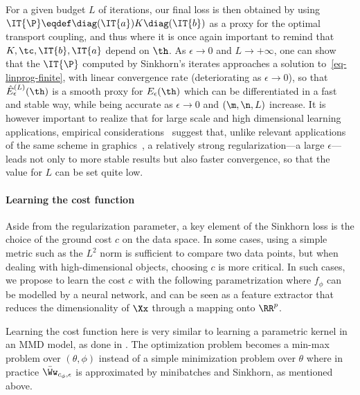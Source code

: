For a given budget $L$ of iterations, our final loss is then obtained by using $\IT{\P} \eqdef \diag(\IT{a})K\diag(\IT{b})$ as a proxy for the optimal transport coupling, and thus
where it is once again important to remind that $K,\tc,\IT{b},\IT{a}$ depend on $\th$. As $\epsilon \rightarrow 0$ and $L \rightarrow +\infty$, one can show that the $\IT{\P}$ computed by Sinkhorn's iterates approaches a solution to~\eqref{eq-linprog-finite}, with linear convergence rate (deteriorating as $\epsilon \rightarrow 0$), so that $\hat E_\epsilon ^{(L)}(\th)$ is a smooth proxy for $E_\epsilon(\th)$ which can be differentiated in a fast and stable way, while being accurate as $\epsilon\rightarrow 0$ and $(\m,\n,L)$ increase. 
% 
It is however important to realize that for large scale and high dimensional learning applications, empirical considerations~\cite{CuturiSinkhorn,kusner2015word,2015-Frogner} suggest that, unlike relevant applications of the same scheme in graphics~\cite{solomon2015convolutional}, a relatively strong regularization---a large $\epsilon$---leads not only to more stable results but also faster convergence, so that the value for $L$ can be set quite low.

\paragraph{Learning the cost function}

Aside from the regularization parameter, a key element of the Sinkhorn loss is the choice of the ground cost $c$ on the data space. In some cases, using a simple metric such as the $L^2$ norm is sufficient to compare two data points, but when dealing with high-dimensional objects, choosing $c$ is more critical. In such cases, we  propose to learn the cost $c$ with the following parametrization
where $f_\phi$ can be modelled by a neural network, and can be seen as a feature extractor that reduces the dimensionality of $\Xx$ through a mapping onto $\RR^p$. 

Learning the cost function here is very similar to learning a parametric kernel in an MMD model, as done in \cite{MMDGAN}. The optimization problem becomes a min-max problem over $(\theta,\phi)$ instead of a simple minimization problem over $\theta$ 
where in practice $\bar{\Ww}_{c_\phi,\epsilon}$ is approximated by minibatches and Sinkhorn, as mentioned above.

